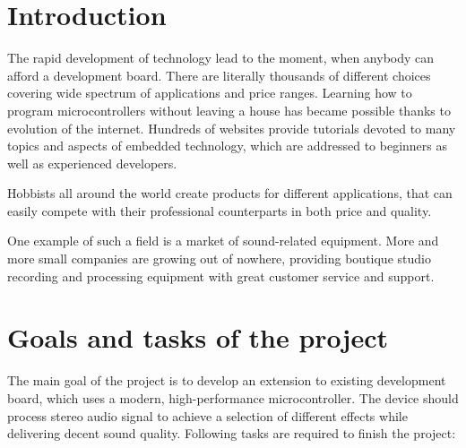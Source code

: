 \documentclass[a4paper,twoside,12pt]{book}
\begin{document}
\chapter{Introduction}\label{ch:intro}
The rapid development of technology lead to the moment,
when anybody can afford a development board.
There are literally thousands of different choices
covering wide spectrum of applications and price ranges.
Learning how to program microcontrollers without leaving a house
has became possible thanks to evolution of the internet.
Hundreds of websites provide tutorials devoted to
many topics and aspects of embedded technology,
which are addressed to beginners as well as 
experienced developers.

Hobbists all around the world create products for different applications,
that can easily compete with their professional counterparts in both price and quality.

One example of such a field is a market of sound-related equipment.
More and more small companies are growing out of nowhere,
providing boutique studio recording and processing equipment
with great customer service and support.




\chapter{Goals and tasks of the project}\label{ch:goals}
The main goal of the project is to develop an extension to existing development board,
which uses a modern, high-performance microcontroller.
The device should process stereo audio signal to achieve a selection of different effects
while delivering decent sound quality.
Following tasks are required to finish the project:
\end{document}
